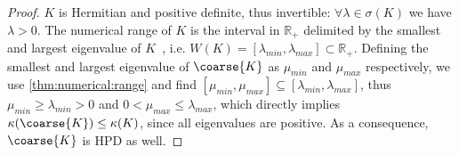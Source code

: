 \begin{proof}
$K$ is Hermitian and positive definite, thus invertible: $\forall \lambda \in \sigma(K)$ we have $\lambda > 0$.
The numerical range of $K$ is the interval in $\mathbb{R}_+$ delimited by the smallest and largest eigenvalue of $K$~\cite{gustafson1997numerical}, i.e. $W(K) = [ \lambda_{min}, \lambda_{max} ] \subset \mathbb{R}_+$.
Defining the smallest and largest eigenvalue of $\coarse{K}$ as $\mu_{min}$ and $\mu_{max}$ respectively, we use \cref{thm:numerical:range} and find $[ \mu_{min}, \mu_{max}] \subseteq [ \lambda_{min}, \lambda_{max} ]$, thus $\mu_{min} \geq \lambda_{min} > 0$ and $0 < \mu_{max} \leq \lambda_{max}$, which directly implies $\kappa(\coarse{K}) \leq \kappa(K)$, since all eigenvalues are positive. As a consequence, $\coarse{K}$ is HPD as well.
\end{proof}

